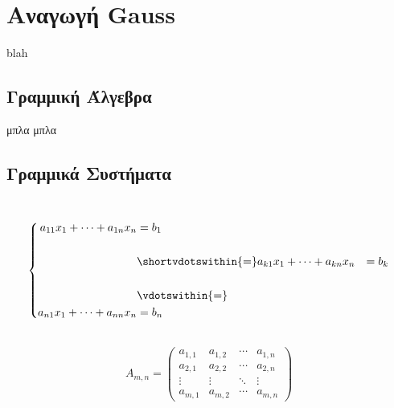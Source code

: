 \section{Αναγωγή \lt Gauss}
blah
\subsection{Γραμμική Άλγεβρα}
μπλα μπλα
\subsection{Γραμμικά Συστήματα}

\ \\
\[\left\{
\begin{aligned}
   a_{11}x_{1}+\dots +a_{1n}x_n &= b_1 \\\\
   &\shortvdotswithin{=}
   a_{k1}x_{1}+\dots +a_{kn}x_n &= b_k \\ \\
   &\vdotswithin{=} \notag \\
  a_{n1}x_{1}+\dots +a_{nn}x_n &= b_n \\
\end{aligned}
\right .\]

\ \\$$
A_{m,n} = 
 \begin{pmatrix}
  a_{1,1} & a_{1,2} & \cdots & a_{1,n} \\
  a_{2,1} & a_{2,2} & \cdots & a_{2,n} \\
  \vdots  & \vdots  & \ddots & \vdots  \\
  a_{m,1} & a_{m,2} & \cdots & a_{m,n} 
 \end{pmatrix}
 $$
